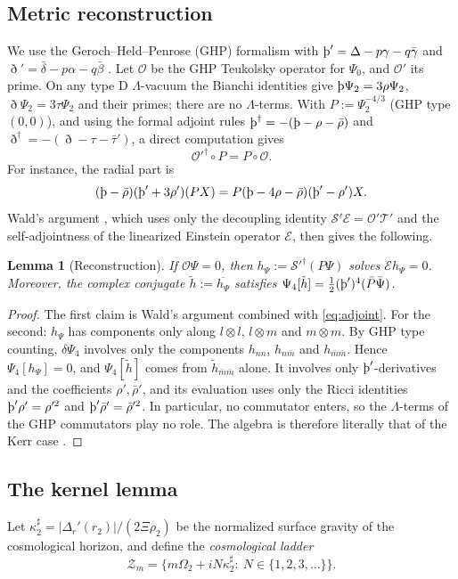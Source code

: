 \documentclass[11pt]{amsart}
\newtheorem{lemma}[theorem]{Lemma}
\theoremstyle{definition}
\theoremstyle{remark}
\numberwithin{equation}{section}
\newcommand{\Th}{\text{\th}}
\begin{document}
\subsection{Metric reconstruction}
We use the Geroch--Held--Penrose (GHP) formalism with $\Th'=\Delta-p\gamma-q\bar\gamma$ and
$\eth'=\bar\delta-p\alpha-q\bar\beta$ \cite{GHP73}. Let $\mathcal O$ be the GHP Teukolsky operator for $\Psi_0$, and
$\mathcal O'$ its prime. On any type D $\Lambda$-vacuum the Bianchi identities give $\Th\Psi_2=3\rho\Psi_2$,
$\eth\Psi_2=3\tau\Psi_2$ and their primes; there are no $\Lambda$-terms. With $P:=\Psi_2^{-4/3}$ (GHP type $(0,0)$),
and using the formal adjoint rules $\Th^\dagger=-(\Th-\rho-\bar\rho)$ and $\eth^\dagger=-(\eth-\tau-\bar\tau')$, a
direct computation gives
\begin{equation}\label{eq:adjoint}
\mathcal O'^\dagger\circ P=P\circ\mathcal O.
\end{equation}
For instance, the radial part is
\[
(\Th-\bar\rho)(\Th'+3\rho')(PX)=P(\Th-4\rho-\bar\rho)(\Th'-\rho')X.
\]
Wald's argument \cite{Wal78}, which uses only the decoupling identity $\mathcal S'\mathcal E=\mathcal O'\mathcal T'$
and the self-adjointness of the linearized Einstein operator $\mathcal E$, then gives the following.

\begin{lemma}[Reconstruction]\label{lem:recon}
If $\mathcal O\Psi=0$, then $h_\Psi:=\mathcal S'^\dagger(P\Psi)$ solves $\mathcal E h_\Psi=0$. Moreover, the complex
conjugate $\tilde h:=\overline{h_\Psi}$ satisfies $\Psi_4[\tilde h]=\frac12(\Th')^4(\bar P\bar\Psi)$.
\end{lemma}

\begin{proof}
The first claim is Wald's argument combined with \eqref{eq:adjoint}. For the second: $h_\Psi$ has components only
along $l\otimes l$, $l\otimes m$ and $m\otimes m$. By GHP type counting, $\delta\Psi_4$ involves only the components
$h_{nn}$, $h_{n\bar m}$ and $h_{\bar m\bar m}$. Hence $\Psi_4[h_\Psi]=0$, and $\Psi_4[\tilde h]$ comes from
$\tilde h_{\bar m\bar m}$ alone. It involves only $\Th'$-derivatives and the
coefficients $\rho',\bar\rho'$, and its evaluation uses only the Ricci identities $\Th'\rho'=\rho'^2$ and
$\Th'\bar\rho'=\bar\rho'^2$. In particular, no commutator enters, so the $\Lambda$-terms of the GHP commutators play
no role. The algebra is therefore literally that of the Kerr case \cite{Wal78,KSFK03}.
\end{proof}

\subsection{The kernel lemma}
Let $\kappa_2^\sharp=|\Delta_r'(r_2)|/(2\Xi\rho_2)$ be the normalized surface gravity of the cosmological horizon,
and define the \emph{cosmological ladder}
\[
\mathcal Z_m=\big\{m\Omega_2+iN\kappa_2^\sharp:\ N\in\{1,2,3,\dots\}\big\}.
\]
\end{document}
